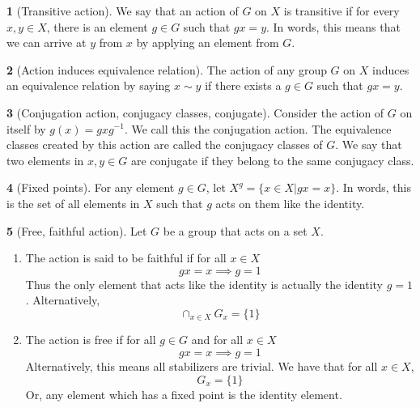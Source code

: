 \documentclass[12pt]{article}
\theoremstyle{definition}
\newtheorem{definition}{\color{NavyBlue}{\textbf{Definition}}}
\begin{document}
\begin{definition}[Transitive action]
We say that an action of $G$ on $X$ is transitive if for every $x,y \in X$, there is an element $g \in G$ such that $gx = y$. In words, this means that we can arrive at $y$ from $x$ by applying an element from $G$.
\end{definition}

\begin{definition}[Action induces equivalence relation]
The action of any group $G$ on $X$ induces an equivalence relation by saying $x \sim y$ if there exists a $g \in G$ such that $gx = y$.
\end{definition}

\begin{definition}[Conjugation action, conjugacy classes, conjugate]
Consider the action of $G$ on itself by $g(x) = gxg^{-1}$. We call this the conjugation action. The equivalence classes created by this action are called the conjugacy classes of $G$. We say that two elements in $x,y\in G$ are conjugate if they belong to the same conjugacy class.
\end{definition}

\begin{definition}[Fixed points]
For any element $g\in G$, let $X^g = \{x\in X|gx = x\}$. In words, this is the set of all elements in $X$ such that $g$ acts on them like the identity.
\end{definition}

\begin{definition}[Free, faithful action]
Let $G$ be a group that acts on a set $X$.
\begin{enumerate}
\item The action is said to be faithful if for all $x \in X$
\begin{equation}
gx = x \implies g = 1
\end{equation}
Thus the only element that acts like the identity is actually the identity $g=1$. Alternatively,
\begin{equation}
\cap_{x \in X} G_x = \{1\}
\end{equation}
\item The action is free if for all $g\in G$ and for all $x \in X$
\begin{equation}
gx = x \implies g = 1
\end{equation}
Alternatively, this means all stabilizers are trivial. We have that for all $x \in X$,
\begin{equation}
G_x = \{1\}
\end{equation}
 Or, any element which has a fixed point is the identity element.
\end{enumerate}
\end{definition}
\end{document}

